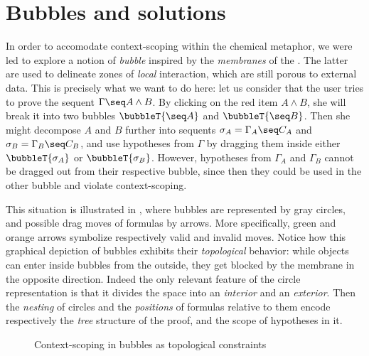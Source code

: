 \section{Bubbles and solutions}

In order to accomodate context-scoping within the chemical metaphor, we were led
to explore a notion of \emph{bubble} inspired by the \emph{membranes} of the
{\cham} \cite{berry_chemical_1989}. The latter are used to delineate zones of
\emph{local} interaction, which are still porous to external data. This is
precisely what we want to do here: let us consider that the user tries to prove
the sequent $\Gamma \seq A \land B$. By clicking on the red item $A \land B$,
she will break it into two bubbles $\bubbleT{\seq A}$ and $\bubbleT{\seq B}$.
Then she might decompose $A$ and $B$ further into sequents $\sigma_A = \Gamma_A
\seq C_A$ and $\sigma_B = \Gamma_B \seq C_B$, and use hypotheses from $\Gamma$
by dragging them inside either $\bubbleT{\sigma_A}$ or $\bubbleT{\sigma_B}$.
However, hypotheses from $\Gamma_A$ and $\Gamma_B$ cannot be dragged out from
their respective bubble, since then they could be used in the other bubble and
violate context-scoping.

This situation is illustrated in , where bubbles are
represented by gray circles, and possible drag moves of formulas by arrows. More
specifically, green and orange arrows symbolize respectively valid and invalid
moves. Notice how this graphical depiction of bubbles exhibits their
\emph{topological} behavior: while objects can enter inside bubbles from the
outside, they get blocked by the membrane in the opposite direction. Indeed the
only relevant feature of the circle representation is that it divides the space
into an \emph{interior} and an \emph{exterior}. Then the \emph{nesting} of
circles and the \emph{positions} of formulas relative to them encode
respectively the \emph{tree} structure of the proof, and the scope of hypotheses
in it.

\begin{figure}
  \caption{Context-scoping in bubbles as topological constraints}
\end{figure}


